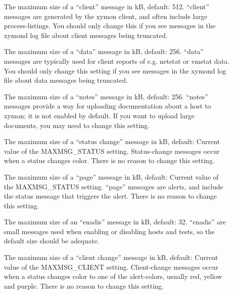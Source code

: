 \begin{description}
 

\item[] The maximum size of a ``client'' message
  in kB, default: 512. ``client'' messages are generated by the xymon
  client, and often include large process-listings. You should only
  change this if you see messages in the xymond log file about client
  messages being truncated. 


 

\item[] The maximum size of a ``data'' message in
  kB, default: 256. ``data'' messages are typically used for client
  reports of e.g. netstat or vmstat data. You should only change this
  setting if you see messages in the xymond log file about data
  messages being truncated. 


 

\item[] The maximum size of a ``notes'' message
  in kB, default: 256. ``notes'' messages provide a way for uploading
  documentation about a host to xymon; it is not enabled by
  default. If you want to upload large documents, you may need to
  change this setting. 


 

\item[] The maximum size of a ``status change''
  message in kB, default: Current value of the MAXMSG\_STATUS
  setting. Status-change messages occur when a status changes
  color. There is no reason to change this setting. 


 

\item[] The maximum size of a ``page'' message in
  kB, default: Current value of the MAXMSG\_STATUS setting. ``page''
  messages are alerts, and include the status message that triggers
  the alert. There is no reason to change this setting. 



\item[] The maximum size of an ``enadis''
  message in kB, default: 32. ``enadis'' are small messages used when
  enabling or disabling hosts and tests, so the default size should be
  adequate. 


 

\item[] The maximum size of a ``client change''
  message in kB, default: Current value of the MAXMSG\_CLIENT
  setting. Client-change messages occur when a status changes color to
  one of the alert-colors, usually red, yellow and purple. There is no
  reason to change this setting. 



\end{description}

